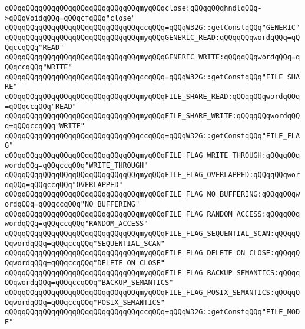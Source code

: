 \verb|qQQqqQQqqQQqqQQqqQQqqQQqqQQqqQQqmyqQQqclose:qQQqqQQqhndlqQQq->qQQqVoidqQQq=qQQqcfqQQq"close"|\newline
\newline
\verb|qQQqqQQqqQQqqQQqqQQqqQQqqQQqqQQqccqQQq=qQQqW32G::getConstqQQq"GENERIC"|\newline
\verb|qQQqqQQqqQQqqQQqqQQqqQQqqQQqqQQqmyqQQqGENERIC_READ:qQQqqQQqwordqQQq=qQQqccqQQq"READ"|\newline
\verb|qQQqqQQqqQQqqQQqqQQqqQQqqQQqqQQqmyqQQqGENERIC_WRITE:qQQqqQQqwordqQQq=qQQqccqQQq"WRITE"|\newline
\newline
\verb|qQQqqQQqqQQqqQQqqQQqqQQqqQQqqQQqccqQQq=qQQqW32G::getConstqQQq"FILE_SHARE"|\newline
\verb|qQQqqQQqqQQqqQQqqQQqqQQqqQQqqQQqmyqQQqFILE_SHARE_READ:qQQqqQQqwordqQQq=qQQqccqQQq"READ"|\newline
\verb|qQQqqQQqqQQqqQQqqQQqqQQqqQQqqQQqmyqQQqFILE_SHARE_WRITE:qQQqqQQqwordqQQq=qQQqccqQQq"WRITE"|\newline
\newline
\verb|qQQqqQQqqQQqqQQqqQQqqQQqqQQqqQQqccqQQq=qQQqW32G::getConstqQQq"FILE_FLAG"|\newline
\verb|qQQqqQQqqQQqqQQqqQQqqQQqqQQqqQQqmyqQQqFILE_FLAG_WRITE_THROUGH:qQQqqQQqwordqQQq=qQQqccqQQq"WRITE_THROUGH"|\newline
\verb|qQQqqQQqqQQqqQQqqQQqqQQqqQQqqQQqmyqQQqFILE_FLAG_OVERLAPPED:qQQqqQQqwordqQQq=qQQqccqQQq"OVERLAPPED"|\newline
\verb|qQQqqQQqqQQqqQQqqQQqqQQqqQQqqQQqmyqQQqFILE_FLAG_NO_BUFFERING:qQQqqQQqwordqQQq=qQQqccqQQq"NO_BUFFERING"|\newline
\verb|qQQqqQQqqQQqqQQqqQQqqQQqqQQqqQQqmyqQQqFILE_FLAG_RANDOM_ACCESS:qQQqqQQqwordqQQq=qQQqccqQQq"RANDOM_ACCESS"|\newline
\verb|qQQqqQQqqQQqqQQqqQQqqQQqqQQqqQQqmyqQQqFILE_FLAG_SEQUENTIAL_SCAN:qQQqqQQqwordqQQq=qQQqccqQQq"SEQUENTIAL_SCAN"|\newline
\verb|qQQqqQQqqQQqqQQqqQQqqQQqqQQqqQQqmyqQQqFILE_FLAG_DELETE_ON_CLOSE:qQQqqQQqwordqQQq=qQQqccqQQq"DELETE_ON_CLOSE"|\newline
\verb|qQQqqQQqqQQqqQQqqQQqqQQqqQQqqQQqmyqQQqFILE_FLAG_BACKUP_SEMANTICS:qQQqqQQqwordqQQq=qQQqccqQQq"BACKUP_SEMANTICS"|\newline
\verb|qQQqqQQqqQQqqQQqqQQqqQQqqQQqqQQqmyqQQqFILE_FLAG_POSIX_SEMANTICS:qQQqqQQqwordqQQq=qQQqccqQQq"POSIX_SEMANTICS"|\newline
\newline
\verb|qQQqqQQqqQQqqQQqqQQqqQQqqQQqqQQqccqQQq=qQQqW32G::getConstqQQq"FILE_MODE"|\newline
